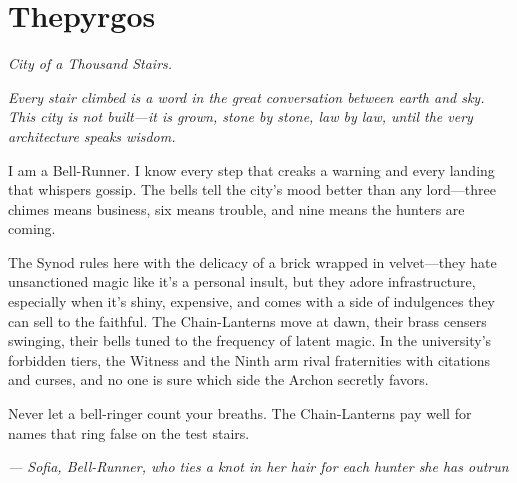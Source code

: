 \newpage

\newpage

\chapter{Thepyrgos}
\emph{City of a Thousand Stairs.}

\noindent
{\Large
\textit{Every stair climbed is a word in the great conversation between earth and sky. This city is not built---it is grown, stone by stone, law by law, until the very architecture speaks wisdom.}

\vspace{0.5em}

I am a Bell-Runner. I know every step that creaks a warning and every landing that whispers gossip. The bells tell the city's mood better than any lord---three chimes means business, six means trouble, and nine means the hunters are coming.

\vspace{0.5em}

The Synod rules here with the delicacy of a brick wrapped in velvet---they hate unsanctioned magic like it's a personal insult, but they adore infrastructure, especially when it's shiny, expensive, and comes with a side of indulgences they can sell to the faithful. The Chain-Lanterns move at dawn, their brass censers swinging, their bells tuned to the frequency of latent magic. In the university's forbidden tiers, the Witness and the Ninth arm rival fraternities with citations and curses, and no one is sure which side the Archon secretly favors.

\vspace{0.5em}

Never let a bell-ringer count your breaths. The Chain-Lanterns pay well for names that ring false on the test stairs.

\vspace{1em}

\noindent\textit{--- Sofia, Bell-Runner, who ties a knot in her hair for each hunter she has outrun}
}

\vspace{1em}

